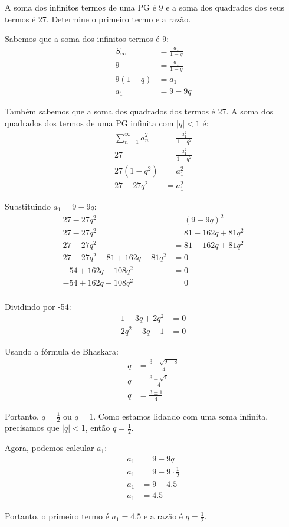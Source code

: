 \documentclass[12pt,a4paper]{article}
\begin{document}
\begin{tcolorbox}[colback=blue!5!white,colframe=blue!75!black,title=Exercício Adicional 9]
A soma dos infinitos termos de uma PG é 9 e a soma dos quadrados dos seus termos é 27. Determine o primeiro termo e a razão.
\end{tcolorbox}

\begin{tcolorbox}[colback=green!5!white,colframe=green!75!black,title=Resolução]
Sabemos que a soma dos infinitos termos é 9:
\begin{align}
S_{\infty} &= \frac{a_1}{1-q}\\
9 &= \frac{a_1}{1-q}\\
9(1-q) &= a_1\\
a_1 &= 9 - 9q
\end{align}

Também sabemos que a soma dos quadrados dos termos é 27. A soma dos quadrados dos termos de uma PG infinita com $|q| < 1$ é:
\begin{align}
\sum_{n=1}^{\infty} a_n^2 &= \frac{a_1^2}{1-q^2}\\
27 &= \frac{a_1^2}{1-q^2}\\
27(1-q^2) &= a_1^2\\
27 - 27q^2 &= a_1^2
\end{align}

Substituindo $a_1 = 9 - 9q$:
\begin{align}
27 - 27q^2 &= (9 - 9q)^2\\
27 - 27q^2 &= 81 - 162q + 81q^2\\
27 - 27q^2 &= 81 - 162q + 81q^2\\
27 - 27q^2 - 81 + 162q - 81q^2 &= 0\\
-54 + 162q - 108q^2 &= 0\\
-54 + 162q - 108q^2 &= 0\\
\end{align}

Dividindo por -54:
\begin{align}
1 - 3q + 2q^2 &= 0\\
2q^2 - 3q + 1 &= 0
\end{align}

Usando a fórmula de Bhaskara:
\begin{align}
q &= \frac{3 \pm \sqrt{9-8}}{4}\\
q &= \frac{3 \pm \sqrt{1}}{4}\\
q &= \frac{3 \pm 1}{4}
\end{align}

Portanto, $q = \frac{1}{2}$ ou $q = 1$. Como estamos lidando com uma soma infinita, precisamos que $|q| < 1$, então $q = \frac{1}{2}$.

Agora, podemos calcular $a_1$:
\begin{align}
a_1 &= 9 - 9q\\
a_1 &= 9 - 9 \cdot \frac{1}{2}\\
a_1 &= 9 - 4.5\\
a_1 &= 4.5
\end{align}

Portanto, o primeiro termo é $a_1 = 4.5$ e a razão é $q = \frac{1}{2}$.
\end{tcolorbox}
\end{document}
